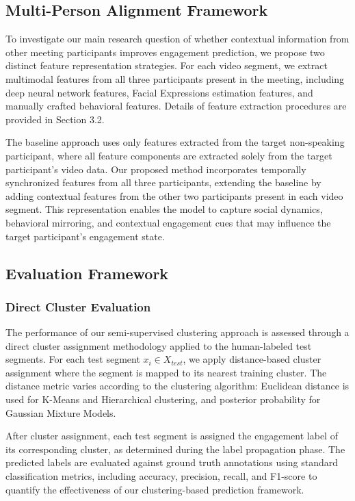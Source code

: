 \documentclass[
]{ceurart}
\begin{document}
\subsection{Multi-Person Alignment Framework}
To investigate our main research question of whether contextual information from other meeting participants improves engagement prediction, we propose two distinct feature representation strategies. For each video segment, we extract multimodal features from all three participants present in the meeting, including deep neural network features, Facial Expressions estimation features, and manually crafted behavioral features. Details of feature extraction procedures are provided in Section 3.2.

The baseline approach uses only features extracted from the target non-speaking participant, where all feature components are extracted solely from the target participant's video data. Our proposed method incorporates temporally synchronized features from all three participants, extending the baseline by adding contextual features from the other two participants present in each video segment. This representation enables the model to capture social dynamics, behavioral mirroring, and contextual engagement cues that may influence the target participant's engagement state.


\subsection{Evaluation Framework}

\subsubsection{Direct Cluster Evaluation}
The performance of our semi-supervised clustering approach is assessed through a direct cluster assignment methodology applied to the human-labeled test segments. For each test segment $x_i \in X_{test}$, we apply distance-based cluster assignment where the segment is mapped to its nearest training cluster. The distance metric varies according to the clustering algorithm: Euclidean distance is used for K-Means and Hierarchical clustering, and posterior probability for Gaussian Mixture Models.

After cluster assignment, each test segment is assigned the engagement label of its corresponding cluster, as determined during the label propagation phase. The predicted labels are evaluated against ground truth annotations using standard classification metrics, including accuracy, precision, recall, and F1-score to quantify the effectiveness of our clustering-based prediction framework.
\end{document}

